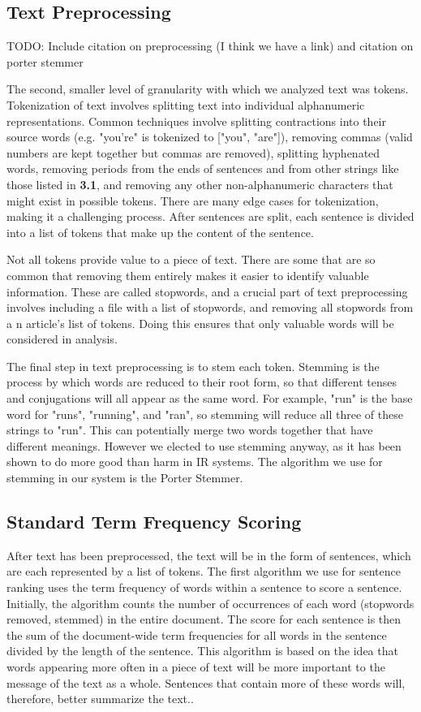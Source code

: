 \documentclass[11pt,a4paper]{article}
\begin{document}
\subsection{Text Preprocessing}
TODO: Include citation on preprocessing (I think we have a link) and citation on porter stemmer

The second, smaller level of granularity with which we analyzed text was tokens. Tokenization of text involves splitting text into individual alphanumeric representations. Common techniques involve splitting contractions into their source words (e.g. "you're" is tokenized to ["you", "are"]), removing commas (valid numbers are kept together but commas are removed), splitting hyphenated words, removing periods from the ends of sentences and from other strings like those listed in \textbf{3.1}, and removing any other non-alphanumeric characters that might exist in possible tokens. There are many edge cases for tokenization, making it a challenging process. After sentences are split, each sentence is divided into a list of tokens that make up the content of the sentence.

Not all tokens provide value to a piece of text. There are some that are so common that removing them entirely makes it easier to identify valuable information. These are called stopwords, and a crucial part of text preprocessing involves including a file with a list of stopwords, and removing all stopwords from a n article's list of tokens. Doing this ensures that only valuable words will be considered in analysis.

The final step in text preprocessing is to stem each token. Stemming is the process by which words are reduced to their root form, so that different tenses and conjugations will all appear as the same word. For example, "run" is the base word for "runs", "running", and "ran", so stemming will reduce all three of these strings to "run". This can potentially merge two words together that have different meanings. However we elected to use stemming anyway, as it has been shown to do more good than harm in IR systems. The algorithm we use for stemming in our system is the Porter Stemmer.

\subsection{Standard Term Frequency Scoring}

After text has been preprocessed, the text will be in the form of sentences, which are each represented by a list of tokens. The first algorithm we use for sentence ranking uses the term frequency of words within a sentence to score a sentence. Initially, the algorithm counts the number of occurrences of each word (stopwords removed, stemmed) in the entire document. The score for each sentence is then the sum of the document-wide term frequencies for all words in the sentence divided by the length of the sentence. This algorithm is based on the idea that words appearing more often in a piece of text will be more important to the message of the text as a whole. Sentences that contain more of these words will, therefore, better summarize the text..
\end{document}
